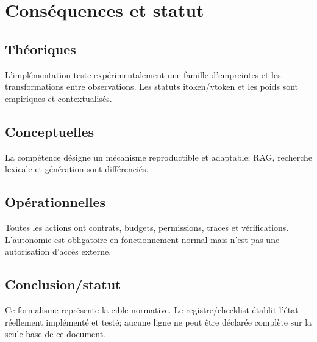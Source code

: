 \documentclass[11pt,a4paper]{report}
\begin{document}
\chapter{Conséquences et statut}
\section{Théoriques}L'implémentation teste expérimentalement une famille d'empreintes et les transformations entre observations. Les statuts itoken/vtoken et les poids sont empiriques et contextualisés.\section{Conceptuelles}La compétence désigne un mécanisme reproductible et adaptable; RAG, recherche lexicale et génération sont différenciés.\section{Opérationnelles}Toutes les actions ont contrats, budgets, permissions, traces et vérifications. L'autonomie est obligatoire en fonctionnement normal mais n'est pas une autorisation d'accès externe.\section{Conclusion/statut}Ce formalisme représente la cible normative. Le registre/checklist établit l'état réellement implémenté et testé; aucune ligne ne peut être déclarée complète sur la seule base de ce document.
\end{document}
